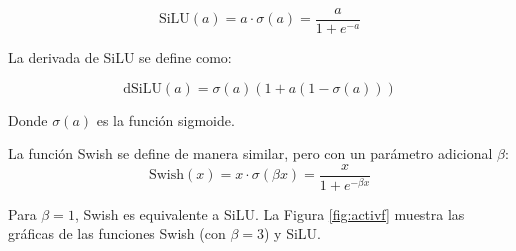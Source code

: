 \begin{equation}
    \text{SiLU}(a) = a \cdot \sigma(a) = \frac{a}{1 + e^{-a}}
\end{equation}

La derivada de SiLU se define como:

\begin{equation}
    \text{dSiLU}(a) = \sigma(a) \left( 1 + a (1 - \sigma(a)) \right)
\end{equation}

Donde \(\sigma(a)\) es la función sigmoide.

La función Swish se define de manera similar, pero con un parámetro adicional \(\beta\):
\begin{equation}
    \text{Swish}(x) = x \cdot \sigma(\beta x) = \frac{x}{1 + e^{-\beta x}}
\end{equation}

Para \(\beta = 1\), Swish es equivalente a SiLU. La Figura \ref{fig:activf} muestra las gráficas de las funciones Swish (con \(\beta = 3\)) y SiLU.

